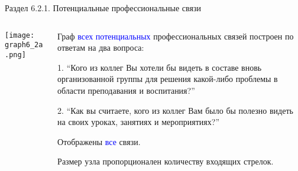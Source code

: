 \begin{frame}{Раздел 6.2.1. Потенциальные профессиональные связи}

\begin{columns}
\begin{column}{0.75\textwidth} 
\centering
          \texttt{[image: graph6\_2a.png]}
\end{column}
\begin{column}{0.25\textwidth} 

\tiny
Граф \textcolor{blue}{всех потенциальных} профессиональных связей построен по ответам на два вопроса:
\smallskip

1. ``Кого из коллег Вы хотели бы видеть в составе вновь организованной группы для решения какой-либо проблемы в области преподавания и воспитания?''
\smallskip

2. ``Как вы считаете, кого из коллег Вам было бы полезно видеть на своих уроках, занятиях и мероприятиях?''
\smallskip

Отображены \textcolor{blue}{все} связи. 
\smallskip

Размер узла пропорционален количеству входящих стрелок.

\end{column}
\end{columns}
\end{frame}


